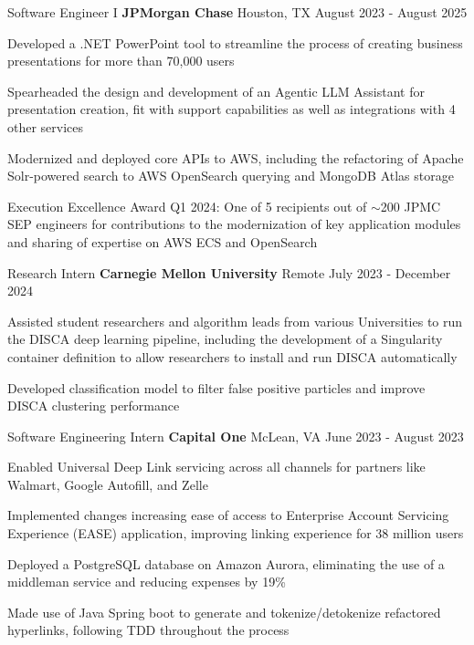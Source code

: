 
\begin{cventries}
  \cventry
    {Software Engineer I}
    {\textbf{JPMorgan Chase}}
    {Houston, TX}
    {August 2023 - August 2025}
    {
      \begin{cvitems}
        \item{Developed a .NET PowerPoint tool to streamline the process of creating business presentations for more than 70,000 users}
        \item{Spearheaded the design and development of an Agentic LLM Assistant for presentation creation, fit with support capabilities as well as integrations with 4 other services}
        \item{Modernized and deployed core APIs to AWS, including the refactoring of Apache Solr-powered search to AWS OpenSearch querying and MongoDB Atlas storage}
        \item{Execution Excellence Award Q1 2024: One of 5 recipients out of $\sim$200 JPMC SEP engineers for contributions to the modernization of key application modules and sharing of expertise on AWS ECS and OpenSearch}
      \end{cvitems}
    }

  \cventry
    {Research Intern}
    {\textbf{Carnegie Mellon University}}
    {Remote}
    {July 2023 - December 2024}
    {
      \begin{cvitems}
        \item{Assisted student researchers and algorithm leads from various Universities to run the DISCA deep learning pipeline, including the development of a Singularity container definition to allow researchers to install and run DISCA automatically}
        \item{Developed classification model to filter false positive particles and improve DISCA clustering performance}
      \end{cvitems}
    }

  \cventry
    {Software Engineering Intern}
    {\textbf{Capital One}}
    {McLean, VA}
    {June 2023 - August 2023}
    {
      \begin{cvitems}
        \item{Enabled Universal Deep Link servicing across all channels for partners like Walmart, Google Autofill, and Zelle}
        \item{Implemented changes increasing ease of access to Enterprise Account Servicing Experience (EASE) application, improving linking experience for 38 million users}
        \item{Deployed a PostgreSQL database on Amazon Aurora, eliminating the use of a middleman service and reducing expenses by 19\%}
        \item{Made use of Java Spring boot to generate and tokenize/detokenize refactored hyperlinks, following TDD throughout the process}
      \end{cvitems}
    }


\end{cventries}
